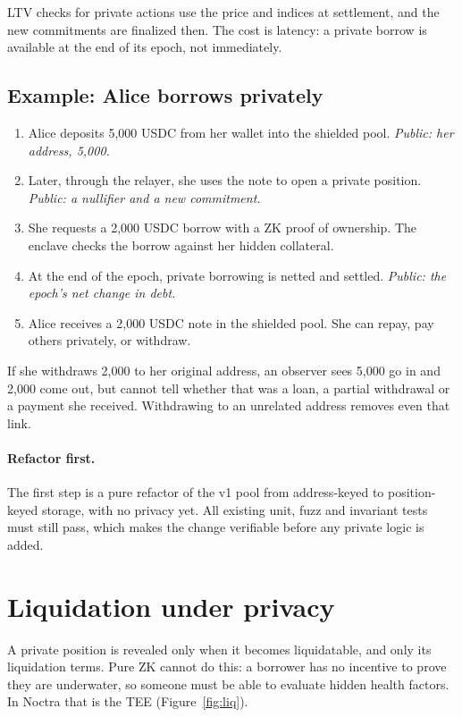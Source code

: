 \documentclass[11pt,a4paper]{article}
\begin{document}
LTV checks for private actions use the price and indices at settlement, and the new commitments are finalized
then. The cost is latency: a private borrow is available at the end of its epoch, not immediately.

\subsection{Example: Alice borrows privately}

\begin{enumerate}
  \item Alice deposits 5,000 USDC from her wallet into the shielded pool. \emph{Public: her address, 5,000.}
  \item Later, through the relayer, she uses the note to open a private position. \emph{Public: a nullifier and a
        new commitment.}
  \item She requests a 2,000 USDC borrow with a ZK proof of ownership. The enclave checks the borrow against her
        hidden collateral.
  \item At the end of the epoch, private borrowing is netted and settled. \emph{Public: the epoch's net change in
        debt.}
  \item Alice receives a 2,000 USDC note in the shielded pool. She can repay, pay others privately, or withdraw.
\end{enumerate}
If she withdraws 2,000 to her original address, an observer sees 5,000 go in and 2,000 come out, but cannot tell
whether that was a loan, a partial withdrawal or a payment she received. Withdrawing to an unrelated address
removes even that link.

\paragraph{Refactor first.} The first step is a pure refactor of the v1 pool from address-keyed to position-keyed storage, with no privacy
yet. All existing unit, fuzz and invariant tests must still pass, which makes the change verifiable before any
private logic is added.

\section{Liquidation under privacy}

A private position is revealed only when it becomes liquidatable, and only its liquidation terms. Pure ZK cannot
do this: a borrower has no incentive to prove they are underwater, so someone must be able to evaluate hidden
health factors. In Noctra that is the TEE (Figure~\ref{fig:liq}).
\end{document}
